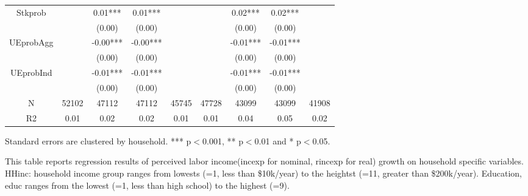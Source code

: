 \begin{table}[p]
\begin{adjustbox}{width={0.9\textwidth}}
\begin{threeparttable}
\begin{tabular}{ccccccccc}
Stkprob          &           &   0.01*** &    0.01*** &             &           &    0.02*** &     0.02*** &              \\
                 &           &    (0.00) &     (0.00) &             &           &     (0.00) &      (0.00) &              \\
UEprobAgg        &           &  -0.00*** &   -0.00*** &             &           &   -0.01*** &    -0.01*** &              \\
                 &           &    (0.00) &     (0.00) &             &           &     (0.00) &      (0.00) &              \\
UEprobInd        &           &  -0.01*** &   -0.01*** &             &           &   -0.01*** &    -0.01*** &              \\
                 &           &    (0.00) &     (0.00) &             &           &     (0.00) &      (0.00) &              \\
N                &     52102 &     47112 &      47112 &       45745 &     47728 &      43099 &       43099 &        41908 \\
R2               &      0.01 &      0.02 &       0.02 &        0.01 &      0.01 &       0.04 &        0.05 &         0.02 \\
\bottomrule
\end{tabular}
\begin{tablenotes}\item Standard errors are clustered by household. *** p$<$0.001, ** p$<$0.01 and * p$<$0.05. 
\item This table reports regression results of perceived labor income(incexp for nominal, rincexp for real) growth on household specific variables. HHinc: household income group ranges from lowests (=1, less than \$10k/year) to the heightst (=11, greater than \$200k/year). Education, educ ranges from the lowest (=1, less than high school) to the highest (=9).
\end{tablenotes}
\end{threeparttable}
\end{adjustbox}
\end{table}